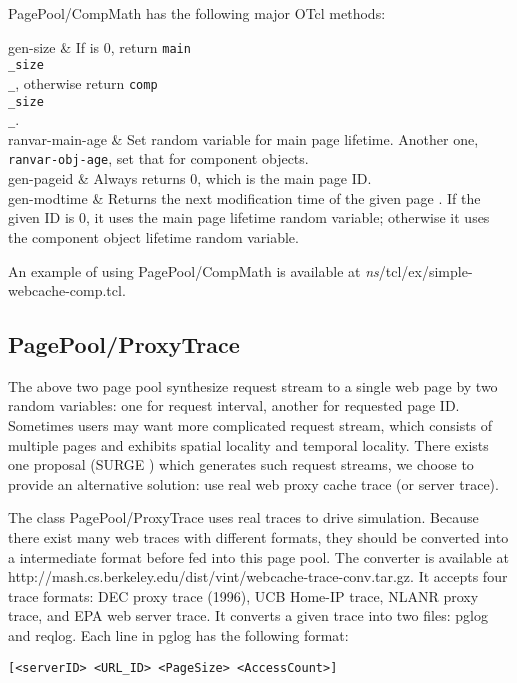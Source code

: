 PagePool/CompMath has the following major OTcl methods:

\begin{\par\tabular{\textwidth}{rX}}
gen-size  & If  is 0, return
  {\tt main\\_size\\_}, otherwise return {\tt comp\\_size\\_}.\\

ranvar-main-age  & Set random variable for main page
  lifetime. Another one, {\tt ranvar-obj-age}, set that for component
  objects. \\

gen-pageid & Always returns 0, which is the main page ID. \\ 

gen-modtime   & Returns the next modification time
  of the given page . If the given ID is 0, it uses the
  main page lifetime random variable; otherwise it uses the component
  object lifetime random variable. \\
\end{\par\tabular{\textwidth}{rX}}

An example of using PagePool/CompMath is available at 
\emph{ns}/tcl/ex/simple-webcache-comp.tcl.

\subsection{PagePool/ProxyTrace}

The above two page pool synthesize request stream to a single web page
by two random variables: one for request interval, another for
requested page ID. Sometimes users may want more complicated request
stream, which consists of multiple pages and exhibits spatial locality
and temporal locality. There exists one proposal (SURGE
\cite{Barf98:WebWorkload}) 
which generates such request streams, we choose to provide an
alternative solution: use real web proxy cache trace (or server
trace). 

The class PagePool/ProxyTrace uses real traces to drive
simulation. Because there exist many web traces with different
formats, they should be converted into a intermediate format before
fed into this page pool. The converter is available at 
http://mash.cs.berkeley.edu/dist/vint/webcache-trace-conv.tar.gz.
It accepts four trace formats: DEC proxy trace (1996), UCB
Home-IP trace, NLANR proxy trace, and EPA web server trace. It
converts a given trace into two files: pglog and reqlog. Each line in
pglog has the following format:
\begin{center}
\begin{verbatim}
[<serverID> <URL_ID> <PageSize> <AccessCount>]
\end{verbatim}
\end{center}

